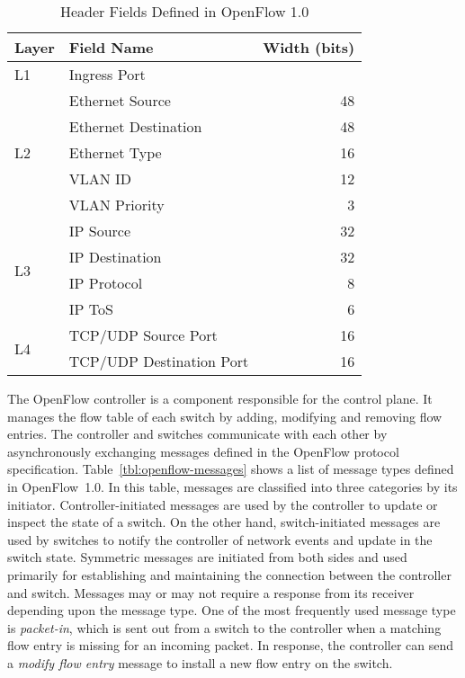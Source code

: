 \begin{table}
\centering
\caption{Header Fields Defined in OpenFlow 1.0}%
\label{tbl:flow-fields}
\begin{tabular}{@{}llr@{}}
\toprule
Layer               & Field Name               & Width (bits) \\ \midrule
L1                  & Ingress Port             &              \\ \cmidrule(l){2-3}
\multirow{5}{*}{L2} & Ethernet Source          & 48           \\
                    & Ethernet Destination     & 48           \\
                    & Ethernet Type            & 16           \\
                    & VLAN ID                  & 12           \\
                    & VLAN Priority            & 3            \\ \cmidrule(l){2-3}
\multirow{4}{*}{L3} & IP Source                & 32           \\
                    & IP Destination           & 32           \\
                    & IP Protocol              & 8            \\
                    & IP ToS                   & 6            \\ \cmidrule(l){2-3}
\multirow{2}{*}{L4} & TCP/UDP Source Port      & 16           \\
                    & TCP/UDP Destination Port & 16           \\ \bottomrule
\end{tabular}
\end{table}

The OpenFlow controller is a component responsible for the control plane. It
manages the flow table of each switch by adding, modifying and removing flow
entries. The controller and switches communicate with each other by
asynchronously exchanging messages defined in the OpenFlow protocol
specification. Table~\ref{tbl:openflow-messages} shows a list of message types
defined in OpenFlow~1.0. In this table, messages are classified into three
categories by its initiator. Controller-initiated messages are used by the
controller to update or inspect the state of a switch. On the other hand,
switch-initiated messages are used by switches to notify the controller of
network events and update in the switch state. Symmetric messages are
initiated from both sides and used primarily for establishing and maintaining
the connection between the controller and switch. Messages may or may not
require a response from its receiver depending upon the message type. One of
the most frequently used message type is \emph{packet-in}, which is sent out
from a switch to the controller when a matching flow entry is missing for an
incoming packet. In response, the controller can send a \emph{modify flow
entry} message to install a new flow entry on the switch.

